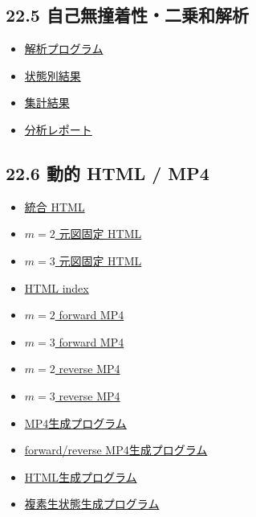 \documentclass[
  a4paper,
]{ltjsarticle}
\providecommand{\tightlist}{%
  \setlength{\itemsep}{0pt}\setlength{\parskip}{0pt}}
\begin{document}
\subsection{22.5
自己無撞着性・二乗和解析}\label{ux81eaux5df1ux7121ux649eux7740ux6027ux4e8cux4e57ux548cux89e3ux6790}

\begin{itemize}
\tightlist
\item
  \href{再現性検証_生データ読出し_20260915/自己無撞着性_二乗和_U4検証_20260915/analyze_K4_self_consistency_square_sum_20260915.py}{解析プログラム}
\item
  \href{再現性検証_生データ読出し_20260915/自己無撞着性_二乗和_U4検証_20260915/K4_self_consistency_square_sum_by_state_20260915.csv}{状態別結果}
\item
  \href{再現性検証_生データ読出し_20260915/自己無撞着性_二乗和_U4検証_20260915/K4_self_consistency_square_sum_summary_20260915.csv}{集計結果}
\item
  \href{再現性検証_生データ読出し_20260915/自己無撞着性_二乗和_U4検証_20260915/K4_self_consistency_square_sum_analysis_20260915.md}{分析レポート}
\end{itemize}

\subsection{22.6 動的 HTML / MP4}\label{ux52d5ux7684-html-mp4}

\begin{itemize}
\tightlist
\item
  \href{K4_harmonic_discrete_phase_animation_20260915.html}{統合 HTML}
\item
  \href{K4_network_wave_discrete_m2.html}{\(m=2\) 元図固定 HTML}
\item
  \href{K4_network_wave_discrete_m3.html}{\(m=3\) 元図固定 HTML}
\item
  \href{K4_network_wave_index.html}{HTML index}
\item
  \href{K4_harmonic_discrete_phase_m2_20260915.mp4}{\(m=2\) forward MP4}
\item
  \href{K4_harmonic_discrete_phase_m3_20260915.mp4}{\(m=3\) forward MP4}
\item
  \href{K4_harmonic_discrete_phase_m2_reverse_20260915.mp4}{\(m=2\)
  reverse MP4}
\item
  \href{K4_harmonic_discrete_phase_m3_reverse_20260915.mp4}{\(m=3\)
  reverse MP4}
\item
  \href{generate_K4_harmonic_discrete_phase_mp4_20260915.py}{MP4生成プログラム}
\item
  \href{generate_K4_harmonic_discrete_phase_forward_reverse_mp4_20260915.py}{forward/reverse
  MP4生成プログラム}
\item
  \href{generate_k4_phase_html.py}{HTML生成プログラム}
\item
  \href{generate_K4_harmonic_complex_raw_states_20260915.py}{複素生状態生成プログラム}
\end{itemize}
\end{document}
